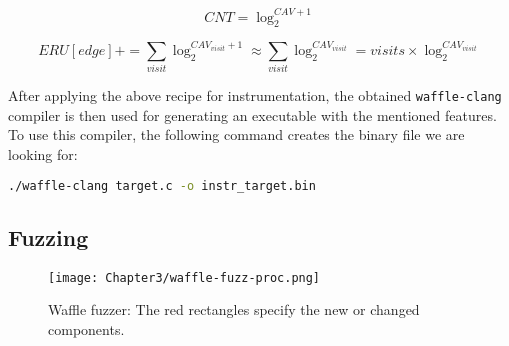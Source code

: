 \begin{equation}
  \label{eq:log}
  CNT = \log_{2}^{CAV+1}
\end{equation}

\begin{equation}
  \label{eq:ERU-log}
  ERU[edge] += \sum_{visit} \log_{2}^{CAV_{visit}+1} \approx \sum_{visit} \log_{2}^{CAV_{visit}} = visits \times \log_{2}^{CAV_{visit}}
\end{equation}



After applying the above recipe for instrumentation, the obtained \texttt{waffle-clang} compiler is then used for generating an executable with the mentioned features. To use this compiler, the following command creates the binary file we are looking for:

\begin{lstlisting}[language=bash,style=CommandStyle,label={lst:wafl-clang}]
  ./waffle-clang target.c -o instr_target.bin
\end{lstlisting}

\subsection{Fuzzing}



\begin{figure}[!b]
  \texttt{[image: Chapter3/waffle-fuzz-proc.png]}
  \centering
  \caption{Waffle fuzzer: The red rectangles specify the new or changed components.}
  \label{fig:waffle-fuzz-proc}
\end{figure}

